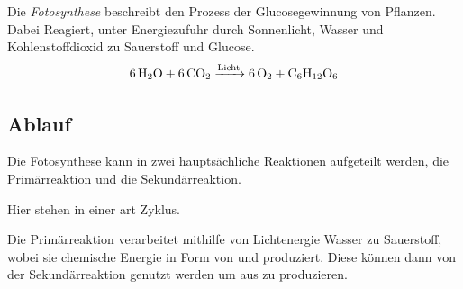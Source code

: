\documentclass{article}
\begin{document}
 
Die \emph{Fotosynthese} beschreibt den Prozess der Glucosegewinnung von Pflanzen. Dabei Reagiert, unter Energiezufuhr durch Sonnenlicht, Wasser und Kohlenstoffdioxid zu Sauerstoff und Glucose.
\[
 \ce{6H2O + 6CO2 ->[Licht] 6O2 + C6H12O6} 
\] 
 
\subsection{Ablauf}
Die Fotosynthese kann in zwei hauptsächliche Reaktionen aufgeteilt werden, die \hyperref[Die Primärreaktion]{Primärreaktion} und die \hyperref[Die Sekundärreaktion]{Sekundärreaktion}. 
 
Hier stehen  in einer art Zyklus.

Die Primärreaktion verarbeitet mithilfe von Lichtenergie Wasser zu Sauerstoff, wobei sie chemische Energie in Form von  und  produziert. Diese können dann von der Sekundärreaktion genutzt werden um  aus  zu produzieren.
\begin{center} 
\end{center} 
\end{document}
